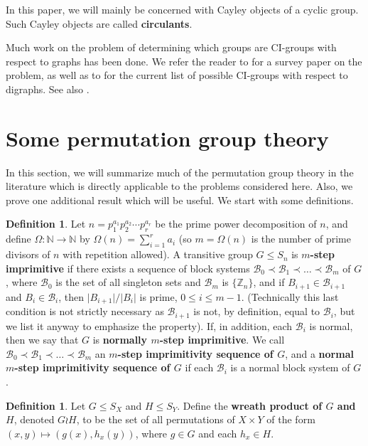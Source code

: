 \documentclass{amsart}
\theoremstyle{definition}
\newtheorem{definition}[thrm]{Definition}
\theoremstyle{remark}
\numberwithin{equation}{section}
\def\Z{{\mathbb Z}}
\def\cal{\mathcal}
\begin{document}
In this paper, we will mainly be concerned with Cayley objects of a cyclic group.  Such Cayley objects are called {\bf circulants}.

Much work on the problem of determining which groups are CI-groups with respect to graphs has been done.  We refer the reader to \cite{Li2002} for a survey paper on the problem, as well as to \cite[Theorem 5.2]{DobsonMS2022} for the current list of possible CI-groups with respect to digraphs.  See also \cite[Chapter 7]{Book}.

\section{Some permutation group theory}

In this section, we will summarize much of the permutation group theory in the literature which is directly applicable to the problems considered here.  Also, we prove one additional result which will be useful.  We start with some definitions.

\begin{definition}\label{mstepdefin}
Let $n = p_1^{a_1}p_2^{a_2}\cdots p_r^{a_r}$ be the prime power decomposition of $n$, and define $\Omega\colon {\mathbb N}\to {\mathbb N}$ by $\Omega(n) = \sum_{i=1}^ra_i$ (so $m = \Omega(n)$ is the number of prime divisors of $n$ with repetition allowed).  A transitive group $G\le S_n$ is {\bf $m$-step imprimitive} if there exists a sequence of block systems ${\cal B}_0 \prec{\cal B}_1\prec \ldots \prec{\cal B}_m$ of $G$, where ${\cal B}_0$ is the set of all singleton sets and ${\cal B}_m$ is $\{\Z_n\}$, and if $B_{i+1}\in{\cal B}_{i+1}$ and $B_i\in{\cal B}_i$, then $\vert B_{i+1}\vert/\vert B_i\vert$ is prime, $0\le i\le m - 1$.  (Technically this last condition is not strictly necessary as ${\cal B}_{i+1}$ is not, by definition, equal to ${\cal B}_i$, but we list it anyway to emphasize the property).  If, in addition, each ${\cal B}_i$ is normal, then we say that $G$ is {\bf normally $m$-step imprimitive}.  We call ${\cal B}_0\prec{\cal B}_1\prec\ldots\prec{\cal B}_m$ an {\bf $m$-step imprimitivity sequence of $G$}, and a {\bf normal $m$-step imprimitivity sequence of $G$} if each ${\cal B}_i$ is a normal block system of $G$.
\end{definition}

\begin{definition}
Let $G\le S_X$ and $H\le S_Y$.  Define the {\bf wreath product of $G$ and $H$}, denoted $G\wr H$, to be the set of all permutations of $X\times Y$ of the form $(x,y)\mapsto (g(x),h_x(y))$, where $g\in G$ and each $h_x\in H$.
\end{definition}
\end{document}
